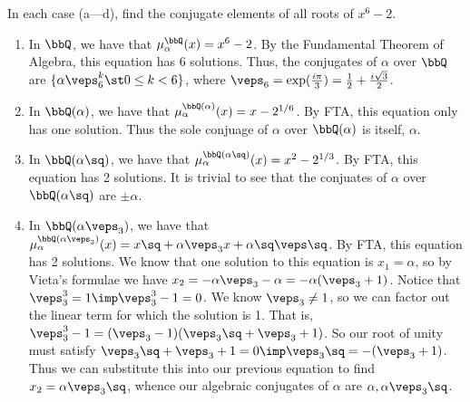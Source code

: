 \documentclass{article}
\begin{document}
\begin{subexercise}
In each case (a---d), find the conjugate elements of all roots of $ x^6-2 $.
\end{subexercise}

\begin{solution}
\begin{enumerate}[label=\alph*)]
  \item In $ \bbQ $, we have that $ \mu_\alpha^{\bbQ}(x) = x^6-2 $.
  By the Fundamental Theorem of Algebra, this equation has 6 solutions.
  Thus, the conjugates of $ \alpha $ over $ \bbQ $ are $ \{\alpha\veps_6^k \st 0\leq k < 6 \} $, where $ \veps_6 = \exp(\frac{i\pi}{3}) = \frac{1}{2}+\frac{i\sqrt 3}{2} $.

  \item In $ \bbQ(\alpha) $, we have that $ \mu_\alpha^{\bbQ(\alpha)}(x) =  x - 2^{1/6} $.
  By FTA, this equation only has one solution.
  Thus the sole conjuage of $ \alpha $ over $ \bbQ(\alpha) $ is itself, $ \alpha $.

  \item In $ \bbQ(\alpha\sq) $, we have that $ \mu_\alpha^{\bbQ(\alpha\sq)}(x) = x^2-2^{1/3} $.
  By FTA, this equation has 2 solutions.
  It is trivial to see that the conjuates of $ \alpha $ over $ \bbQ(\alpha\sq) $ are $ \pm\alpha $.

  \item In $ \bbQ(\alpha\veps_3) $, we have that $ \mu_\alpha^{\bbQ(\alpha\veps_3)}(x) = x\sq+\alpha\veps_3x + \alpha\sq\veps\sq $.
  By FTA, this equation has 2 solutions.
  We know that one solution to this equation is $ x_1 = \alpha $, so by Vieta's formulae we have $ x_2 = -\alpha\veps_3 - \alpha = -\alpha(\veps_3+1) $.
  Notice that $ \veps_3^3 = 1 \imp \veps_3^3-1=0 $.
  We know $ \veps_3\neq 1 $, so we can factor out the linear term for which the solution is 1.
  That is, $ \veps_3^3-1 = (\veps_3-1)(\veps_3\sq+\veps_3+1) $.
  So our root of unity must satisfy $ \veps_3\sq+\veps_3+1 = 0 \imp \veps_3\sq=-(\veps_3+1) $.
  Thus we can substitute this into our previous equation to find $ x_2 = \alpha\veps_3\sq $, whence our algebraic conjugates of $ \alpha $ are $ \alpha, \alpha\veps_3\sq $.
\end{enumerate}
\end{solution}
\end{document}
